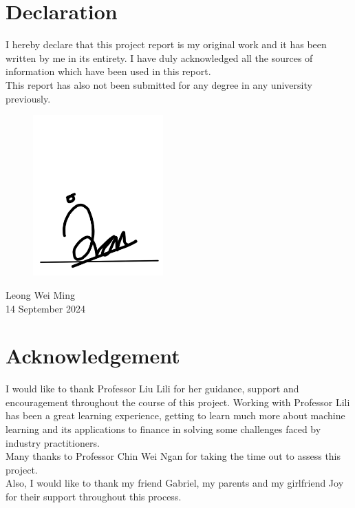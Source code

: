 \documentclass[a4paper,12pt]{report}
\numberwithin{equation}{section}
\theoremstyle{definition}
\begin{document}
\chapter*{Declaration}
\begin{center}{\large
I hereby declare that this project report is my original work and it has been written by me in its entirety. I have duly acknowledged all the sources of information which have been used in this report. \\[0.5in]
This report has also not been submitted for any degree in any university previously.

\begin{figure}[H]
  \centerline{\includegraphics[width=5cm]{signature}}
\end{figure}
Leong Wei Ming\\

14 September 2024
}

\chapter*{Acknowledgement}
{\large
I would like to thank Professor Liu Lili for her guidance, support and encouragement throughout the course of this project. Working with Professor Lili has been a great learning experience, getting to learn much more about machine learning and its applications to finance in solving some challenges faced by industry practitioners. \\[0.5in]

Many thanks to Professor Chin Wei Ngan for taking the time out to assess this project. \\[0.5in]

Also, I would like to thank my friend Gabriel, my parents and my girlfriend Joy for their support throughout this process. 

}
\end{center}
\setcounter{secnumdepth}{3}
\setcounter{tocdepth}{3}
\end{document}
